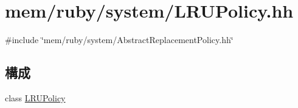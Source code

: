 \hypertarget{LRUPolicy_8hh}{
\section{mem/ruby/system/LRUPolicy.hh}
\label{LRUPolicy_8hh}
}
{\ttfamily \#include \char`\"{}mem/ruby/system/AbstractReplacementPolicy.hh\char`\"{}}\par
\subsection*{構成}
\begin{DoxyCompactItemize}
\item 
class \hyperlink{classLRUPolicy}{LRUPolicy}
\end{DoxyCompactItemize}
